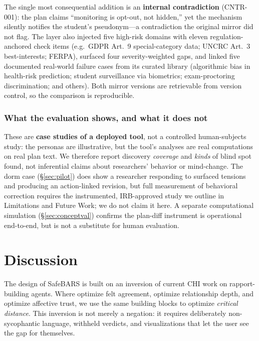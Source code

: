 \documentclass[sigconf,screen]{acmart}
\begin{document}
The single most consequential addition is an \textbf{internal contradiction}
(CNTR-001): the plan claims ``monitoring is opt-out, not hidden,'' yet the
mechanism silently notifies the student's pseudonym---a contradiction the
original mirror did not flag. The layer also injected five high-risk domains
with eleven regulation-anchored check items (e.g.\ GDPR Art.~9
special-category data; UNCRC Art.~3 best-interests; FERPA), surfaced four
severity-weighted gaps, and linked five documented real-world failure cases
from its curated library (algorithmic bias in health-risk prediction;
student surveillance via biometrics; exam-proctoring discrimination; and
others). Both mirror versions are retrievable from version control, so the
comparison is reproducible.

\subsubsection{What the evaluation shows, and what it does not}
\label{sec:eval-bounds}
These are \textbf{case studies of a deployed tool}, not a controlled
human-subjects study: the personas are illustrative, but the tool's analyses
are real computations on real plan text. We therefore report discovery
\emph{coverage} and \emph{kinds} of blind spot found, not inferential claims
about researchers' behavior or mind-change. The dorm case (\S\ref{sec:pilot})
does show a researcher responding to surfaced tensions and producing an
action-linked revision, but full measurement of behavioral correction
requires the instrumented, IRB-approved study we outline in
Limitations and Future Work; we do not claim it here. A separate computational
simulation (\S\ref{sec:conceptval}) confirms the plan-diff instrument is
operational end-to-end, but is not a substitute for human evaluation.


\section{Discussion}

The design of SafeBARS is built on an inversion of current CHI work on
rapport-building agents. Where \citeauthor{vibecheck26} optimize felt
agreement, \citeauthor{recallbot26} optimize relationship depth, and
\citeauthor{hearinsilence26} optimize affective trust, we use the same
building blocks to optimize \emph{critical distance}. This inversion is not
merely a negation: it requires deliberately non-sycophantic language,
withheld verdicts, and visualizations that let the user see the gap for
themselves.
\end{document}
